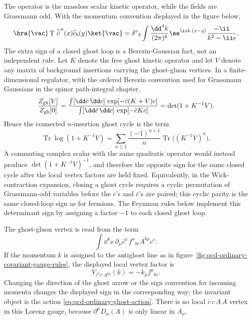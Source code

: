 The operator is the massless scalar kinetic operator, while the fields are
Grassmann odd.  With the momentum convention displayed in the figure below,
\begin{equation}
  \bra{\vac}
  \operatorname T\,\widehat{\bar c}^{\,a}(x)\widehat c_b(y)
  \ket{\vac}
  =
  \delta^a{}_{b}
  \int\frac{\dd^4k}{(2\pi)^4}
  \ee^{\ii k\cdot(x-y)}
  \frac{-\ii}{k^2-\ii\epsilon}.
  \label{eq:qcd-ordinary-ghost-propagator}
\end{equation}
The extra sign of a closed ghost loop is a Berezin-Gaussian fact, not an
independent rule.  Let \(K\) denote the free ghost kinetic operator and let
\(V\) denote any matrix of background insertions carrying the ghost-gluon
vertices.  In a finite-dimensional regulator, with the ordered Berezin
convention used for Grassmann Gaussians in the spinor path-integral chapter,
\[
  \frac{Z_{\rm gh}[V]}{Z_{\rm gh}[0]}
  =
  \frac{\int[\dd\bar c\,\dd c]\,
    \exp[-\bar c(K+V)c]}
       {\int[\dd\bar c\,\dd c]\,
    \exp[-\bar cKc]}
  =
  \det(1+K^{-1}V).
\]
Hence the connected \(n\)-insertion ghost cycle is the term
\[
  \operatorname{Tr}\log(1+K^{-1}V)
  =
  \sum_{n\ge1}\frac{(-1)^{n+1}}{n}
  \operatorname{Tr}\bigl((K^{-1}V)^n\bigr).
\]
A commuting complex scalar with the same quadratic operator would instead
produce \(\det(1+K^{-1}V)^{-1}\), and therefore the opposite sign for the same
closed cycle after the local vertex factors are held fixed.  Equivalently, in
the Wick-contraction expansion, closing a ghost cycle requires a cyclic
permutation of Grassmann-odd variables before the \(c\)'s and \(\bar c\)'s are
paired; this cyclic parity is the same closed-loop sign as for fermions.  The
Feynman rules below implement this determinant sign by assigning a factor
\(-1\) to each closed ghost loop.

The ghost-gluon vertex is read from the term
\[
  \int\dd^4x\,
  \partial_\mu\bar c^a\,f^a{}_{bc}A^{b\mu}c^c .
\]
If the momentum \(k\) is assigned to the antighost line as in
figure~\ref{fig:qcd-ordinary-covariant-gauge-rules}, the displayed local
vertex factor is
\begin{equation}
  V_{\bar c^a c^c A^{b\mu}}(k)
  =
  -k_\mu f^a{}_{bc}.
  \label{eq:qcd-ordinary-ghost-gluon-vertex}
\end{equation}
Changing the direction of the ghost arrow or the sign convention for incoming
momenta changes the displayed sign in the corresponding way; the invariant
object is the action \eqref{eq:qcd-ordinary-ghost-action}.  There is no local
\(\bar c\,c\,A\,A\) vertex in this Lorenz gauge, because
\(\partial^\mu D_\mu(A)\) is only linear in \(A_\mu\).

